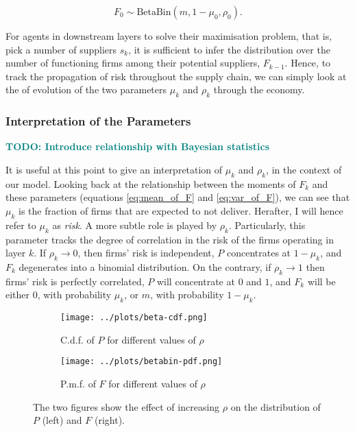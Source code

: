 \documentclass[draft, american, abstract=on]{scrartcl}
\theoremstyle{plain}
\newcommand{\Beta}{\text{Beta}}
\newcommand{\Bin}{\text{Bin}}
\newcommand\notes[1]{\textcolor{teal}{\footnotesize \textbf{#1}}}
\begin{document}
\begin{equation}
  F_0 \sim \Beta\Bin(m, 1 - \mu_0, \rho_0).
\end{equation}


For agents in downstream layers to solve their maximisation problem, that is, pick a number of suppliers $s_k$, it is sufficient to infer the distribution over the number of functioning firms among their potential suppliers, $F_{k - 1}$. Hence, to track the propagation of risk throughout the supply chain, we can simply look at the of evolution of the two parameters $\mu_k$ and $\rho_k$ through the economy.

\subsubsection{Interpretation of the Parameters}

\notes{TODO: Introduce relationship with Bayesian statistics}

It is useful at this point to give an interpretation of $\mu_k$ and $\rho_k$, in the context of our model. Looking back at the relationship between the moments of $F_k$ and these parameters (equations \ref{eq:mean_of_F} and \ref{eq:var_of_F}), we can see that $\mu_k$ is the fraction of firms that are expected to not deliver. Herafter, I will hence refer to $\mu_k$ as \textit{risk}. A more subtle role is played by $\rho_k$. Particularly, this parameter tracks the degree of correlation in the risk of the firms operating in layer $k$. If $\rho_k \to 0$, then firms' risk is independent, $P$ concentrates at $1 - \mu_k$, and $F_k$ degenerates into a binomial distribution. On the contrary, if $\rho_k \rightarrow 1$ then firms' risk is perfectly correlated, $P$ will concentrate at $0$ and $1$, and $F_k$ will be either 0, with probability $\mu_k$, or $m$, with probability $1 - \mu_k$.



\begin{figure}[H]
  \centering
  \begin{subfigure}{.5\textwidth}
    \centering
    \texttt{[image: ../plots/beta-cdf.png]}
    \caption{C.d.f. of $P$ for different values of $\rho$}
    \label{fig:distribution-illustration:beta}
  \end{subfigure}%
  \begin{subfigure}{.5\textwidth}
    \centering
    \texttt{[image: ../plots/betabin-pdf.png]} 
    \caption{P.m.f. of $F$ for different values of $\rho$}
    \label{fig:distribution-illustration:beta-binomial}
  \end{subfigure}%
  \caption{The two figures show the effect of increasing $\rho$ on the distribution of $P$ (left) and $F$ (right).}
  \label{fig:distribution-illustration}
\end{figure}
\end{document}

